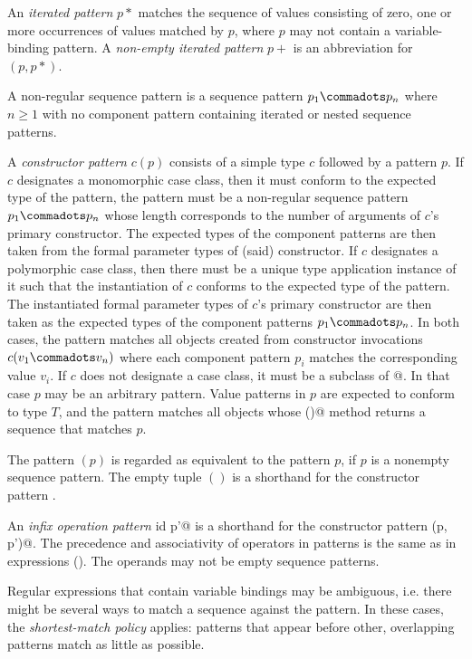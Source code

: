 \documentclass[11pt]{report}
\begin{document}
An {\em iterated pattern} $p*$ matches the sequence of values
consisting of zero, one or more occurrences of values matched by $p$,
where $p$ may not contain a variable-binding pattern. A {\em non-empty
iterated pattern} $p+$ is an abbreviation for $(p,p*)$. 

A non-regular sequence pattern is a sequence pattern $p_1 \commadots p_n$ 
where $n \geq 1$ with no component pattern containing iterated or nested
sequence patterns.

A {\em constructor pattern} $c ( p )$ consists of a simple type $c$
followed by a pattern $p$.  If $c$ designates a monomorphic case
class, then it must conform to the expected type of the pattern, the
pattern must be a non-regular sequence pattern $p_1 \commadots p_n$
whose length corresponds to the number of arguments of $c$'s primary
constructor. The expected types of the component patterns are then
taken from the formal parameter types of (said) constructor.  If $c$
designates a polymorphic case class, then there must be a unique type
application instance of it such that the instantiation of $c$ conforms
to the expected type of the pattern. The instantiated formal parameter
types of $c$'s primary constructor are then taken as the expected
types of the component patterns $p_1\commadots p_n$.  In both cases,
the pattern matches all objects created from constructor invocations
$c(v_1 \commadots v_n)$ where each component pattern $p_i$ matches the
corresponding value $v_i$. If $c$ does not designate a case class, it
must be a subclass of \verb@Seq[ T ]@. In that case $p$ may be an
arbitrary pattern. Value patterns in $p$ are expected to conform to
type $T$, and the pattern matches all objects whose \verb@elements()@
method returns a sequence that matches $p$.

The pattern $(p)$ is regarded as equivalent to the pattern $p$, if $p$
is a nonempty sequence pattern. The empty tuple $()$ is a shorthand
for the constructor pattern \verb@Unit@.

An {\em infix operation pattern} \verb@p id p'@ is a shorthand for the
constructor pattern \verb@id(p, p')@.  The precedence and
associativity of operators in patterns is the same as in expressions
(). The operands may not be empty sequence
patterns.

Regular expressions that contain variable bindings may be ambiguous,
i.e. there might be several ways to match a sequence against the
pattern. In these cases, the \emph{shortest-match policy} applies:
patterns that appear before other, overlapping patterns match
as little as possible.
\end{document}
